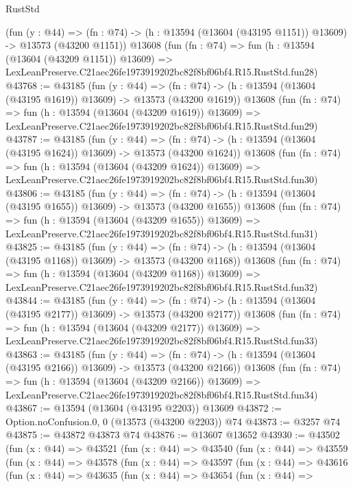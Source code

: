\begin{lexlean}{RustStd}
\begin{coremodule}
    (fun (y : @44) =>
    (fn : @74) -> (h : @13594 (@13604 (@43195 @1151)) @13609) -> @13573 (@43200 @1151))
    @13608
    (fun (fn : @74) =>
    fun (h : @13594 (@13604 (@43209 @1151)) @13609) =>
    LexLeanPreserve.C21aec26fe1973919202bc82f8bf06bf4.R15.RustStd.fun28)
@43768 := @43185
    (fun (y : @44) =>
    (fn : @74) -> (h : @13594 (@13604 (@43195 @1619)) @13609) -> @13573 (@43200 @1619))
    @13608
    (fun (fn : @74) =>
    fun (h : @13594 (@13604 (@43209 @1619)) @13609) =>
    LexLeanPreserve.C21aec26fe1973919202bc82f8bf06bf4.R15.RustStd.fun29)
@43787 := @43185
    (fun (y : @44) =>
    (fn : @74) -> (h : @13594 (@13604 (@43195 @1624)) @13609) -> @13573 (@43200 @1624))
    @13608
    (fun (fn : @74) =>
    fun (h : @13594 (@13604 (@43209 @1624)) @13609) =>
    LexLeanPreserve.C21aec26fe1973919202bc82f8bf06bf4.R15.RustStd.fun30)
@43806 := @43185
    (fun (y : @44) =>
    (fn : @74) -> (h : @13594 (@13604 (@43195 @1655)) @13609) -> @13573 (@43200 @1655))
    @13608
    (fun (fn : @74) =>
    fun (h : @13594 (@13604 (@43209 @1655)) @13609) =>
    LexLeanPreserve.C21aec26fe1973919202bc82f8bf06bf4.R15.RustStd.fun31)
@43825 := @43185
    (fun (y : @44) =>
    (fn : @74) -> (h : @13594 (@13604 (@43195 @1168)) @13609) -> @13573 (@43200 @1168))
    @13608
    (fun (fn : @74) =>
    fun (h : @13594 (@13604 (@43209 @1168)) @13609) =>
    LexLeanPreserve.C21aec26fe1973919202bc82f8bf06bf4.R15.RustStd.fun32)
@43844 := @43185
    (fun (y : @44) =>
    (fn : @74) -> (h : @13594 (@13604 (@43195 @2177)) @13609) -> @13573 (@43200 @2177))
    @13608
    (fun (fn : @74) =>
    fun (h : @13594 (@13604 (@43209 @2177)) @13609) =>
    LexLeanPreserve.C21aec26fe1973919202bc82f8bf06bf4.R15.RustStd.fun33)
@43863 := @43185
    (fun (y : @44) =>
    (fn : @74) -> (h : @13594 (@13604 (@43195 @2166)) @13609) -> @13573 (@43200 @2166))
    @13608
    (fun (fn : @74) =>
    fun (h : @13594 (@13604 (@43209 @2166)) @13609) =>
    LexLeanPreserve.C21aec26fe1973919202bc82f8bf06bf4.R15.RustStd.fun34)
@43867 := @13594 (@13604 (@43195 @2203)) @13609
@43872 := Option.noConfusion.{0, 0} (@13573 (@43200 @2203)) @74
@43873 := @3257 @74
@43875 := @43872 @43873 @74
@43876 := @13607 @13652
@43930 := @43502
    (fun (x : @44) =>
    @43521
      (fun (x : @44) =>
      @43540
        (fun (x : @44) =>
        @43559
          (fun (x : @44) =>
          @43578
            (fun (x : @44) =>
            @43597
              (fun (x : @44) =>
              @43616
                (fun (x : @44) =>
                @43635
                  (fun (x : @44) =>
                  @43654
                    (fun (x : @44) =>

\end{coremodule}
\end{lexlean}
